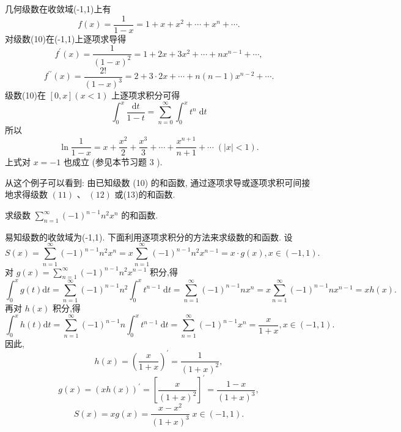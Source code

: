\begin{example}

\end{example}
几何级数在收敛域(-1,1)上有
\[
f\left( x\right)  = \frac{1}{1 - x} = 1 + x + {x}^{2} + \cdots  + {x}^{n} + \cdots . \tag{10}
\]
对级数(10)在(-1,1)上逐项求导得
\[
{f}^{\prime }\left( x\right)  = \frac{1}{{\left( 1 - x\right) }^{2}} = 1 + {2x} + 3{x}^{2} + \cdots  + n{x}^{n - 1} + \cdots , \tag{11}
\]
\[
{f}^{\prime \prime }\left( x\right)  = \frac{2!}{{\left( 1 - x\right) }^{3}} = 2 + 3 \cdot  {2x} + \cdots  + n\left( {n - 1}\right) {x}^{n - 2} + \cdots . \tag{12}
\]
级数(10)在 \(\left\lbrack  {0,x}\right\rbrack  \left( {x < 1}\right)\) 上逐项求积分可得
\[
{\int }_{0}^{x}\frac{\mathrm{d}t}{1 - t} = \mathop{\sum }\limits_{{n = 0}}^{\infty }{\int }_{0}^{x}{t}^{n}\mathrm{\;d}t
\]
所以
\[
\ln \frac{1}{1 - x} = x + \frac{{x}^{2}}{2} + \frac{{x}^{3}}{3} + \cdots  + \frac{{x}^{n + 1}}{n + 1} + \cdots \;\left( {\left| x\right|  < 1}\right) . \tag{13}
\]
上式对 \(x =  - 1\) 也成立 (参见本节习题 3 ).

从这个例子可以看到: 由已知级数 (10) 的和函数, 通过逐项求导或逐项求积可间接地求得级数 \(\left( {11}\right) \text{ 、 }\left( {12}\right)\) 或(13)的和函数.

\begin{example}

\end{example}
求级数 \(\mathop{\sum }\limits_{{n = 1}}^{\infty }{\left( -1\right) }^{n - 1}{n}^{2}{x}^{n}\) 的和函数.

\begin{solution}

\end{solution}
易知级数的收敛域为(-1,1). 下面利用逐项求积分的方法来求级数的和函数. 设
\[
S\left( x\right)  = \mathop{\sum }\limits_{{n = 1}}^{\infty }{\left( -1\right) }^{n - 1}{n}^{2}{x}^{n} = x\mathop{\sum }\limits_{{n = 1}}^{\infty }{\left( -1\right) }^{n - 1}{n}^{2}{x}^{n - 1} = x \cdot  g\left( x\right) ,x \in  \left( {-1,1}\right) .
\]
对 \(g\left( x\right)  = \mathop{\sum }\limits_{{n = 1}}^{\infty }{\left( -1\right) }^{n - 1}{n}^{2}{x}^{n - 1}\) 积分,得
\[
{\int }_{0}^{x}g\left( t\right) \mathrm{d}t = \mathop{\sum }\limits_{{n = 1}}^{\infty }{\left( -1\right) }^{n - 1}{n}^{2}{\int }_{0}^{x}{t}^{n - 1}\mathrm{\;d}t = \mathop{\sum }\limits_{{n = 1}}^{\infty }{\left( -1\right) }^{n - 1}n{x}^{n} = x\mathop{\sum }\limits_{{n = 1}}^{\infty }{\left( -1\right) }^{n - 1}n{x}^{n - 1} = {xh}\left( x\right) .
\]
再对 \(h\left( x\right)\) 积分,得
\[
{\int }_{0}^{x}h\left( t\right) \mathrm{d}t = \mathop{\sum }\limits_{{n = 1}}^{\infty }{\left( -1\right) }^{n - 1}n{\int }_{0}^{x}{t}^{n - 1}\mathrm{\;d}t = \mathop{\sum }\limits_{{n = 1}}^{\infty }{\left( -1\right) }^{n - 1}{x}^{n} = \frac{x}{1 + x},x \in  \left( {-1,1}\right) .
\]
因此,
\[
h\left( x\right)  = {\left( \frac{x}{1 + x}\right) }^{\prime } = \frac{1}{{\left( 1 + x\right) }^{2}},
\]
\[
g\left( x\right)  = {\left( xh\left( x\right) \right) }^{\prime } = {\left\lbrack  \frac{x}{{\left( 1 + x\right) }^{2}}\right\rbrack  }^{\prime } = \frac{1 - x}{{\left( 1 + x\right) }^{3}},
\]
\[
S\left( x\right)  = {xg}\left( x\right)  = \frac{x - {x}^{2}}{{\left( 1 + x\right) }^{3}}\;x \in  \left( {-1,1}\right) .
\]
